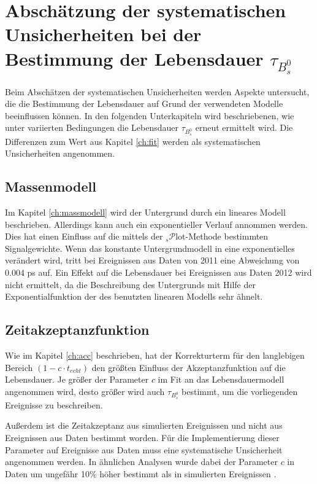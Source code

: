 \documentclass{article}
\begin{document}
\newpage
\section[Abschätzung der systematischen Unsicherheiten bei der \\ Bestimmung der Lebensdauer $\tau_{B_s^0}$]{Abschätzung der systematischen Unsicherheiten bei der Bestimmung der Lebensdauer $\tau_{B_s^0}$}
\label{ch:syst}
Beim Abschätzen der systematischen Unsicherheiten werden Aspekte untersucht, die die Bestimmung der Lebensdauer auf Grund der verwendeten Modelle beeinflussen können. In den folgenden Unterkapiteln wird beschriebenen, wie unter variierten Bedingungen die Lebensdauer $\tau_{B_s^0}$ erneut ermittelt wird. Die Differenzen zum Wert aus Kapitel \ref{ch:fit} werden als systematischen Unsicherheiten angenommen. %

\subsection{Massenmodell}
Im Kapitel \ref{ch:massmodell} wird der Untergrund durch ein lineares Modell beschrieben. Allerdings kann auch ein exponentieller Verlauf annommen werden. Dies hat einen Einfluss auf die mittels der $_s\mathcal{P}$lot-Methode bestimmten Signalgewichte. Wenn das konstante Untergrundmodell in eine exponentielles verändert wird, tritt bei Ereignissen aus Daten von 2011 eine Abweichung von 0.004 ps auf. Ein Effekt auf die Lebensdauer bei Ereignissen aus Daten 2012 wird nicht ermittelt, da die Beschreibung des Untergrunds mit Hilfe der Exponentialfunktion der des benutzten linearen Modells sehr ähnelt. 

\subsection{Zeitakzeptanzfunktion}
Wie im Kapitel \ref{ch:acc} beschrieben, hat der Korrekturterm für den langlebigen Bereich $(1-c\cdot t_{echt})$ den größten Einfluss der Akzeptanzfunktion auf die Lebensdauer. Je größer der Parameter $c$ im Fit an das Lebensdauermodell angenommen wird, desto größer wird auch $\tau_{B_s^0}$ bestimmt, um die vorliegenden Ereignisse zu beschreiben. 

Außerdem ist die Zeitakzeptanz aus simulierten Ereignissen und nicht aus Ereignissen aus Daten bestimmt worden. Für die Implementierung dieser Parameter auf Ereignisse aus Daten muss eine systematische Unsicherheit angenommen werden. In ähnlichen Analysen wurde dabei der Parameter $c$ in Daten um ungefähr 10\% höher bestimmt als in simulierten Ereignissen \cite{thomas}.
\end{document}

